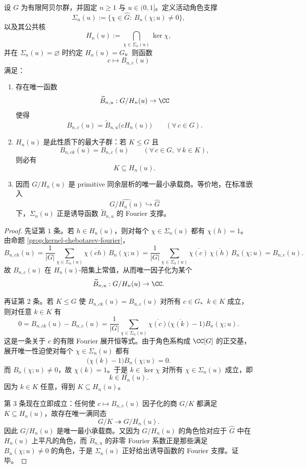 \begin{theorem}\label{thm:conclusion-primitive-minimal-carrier-quotient}
设 \(G\) 为有限阿贝尔群，并固定 \(n\ge 1\) 与 \(u\in(0,1]\)。定义活动角色支撑
\[
\Sigma_n(u):=\{\chi\in\widehat G:\ B_n(\chi;u)\neq 0\},
\]
以及其公共核
\[
H_n(u):=
\bigcap_{\chi\in\Sigma_n(u)}\ker\chi,
\]
并在 \(\Sigma_n(u)=\varnothing\) 时约定 \(H_n(u)=G\)。则函数
\[
c\longmapsto B_{n,c}(u)
\]
满足：
\begin{enumerate}
  \item 存在唯一函数
  \[
  \widetilde B_{n,u}:G/H_n(u)\to\CC
  \]
  使得
  \[
  \boxed{\;
  B_{n,c}(u)=\widetilde B_{n,u}\bigl(cH_n(u)\bigr)
  \qquad(\forall\,c\in G).\;}
  \]
  \item \(H_n(u)\) 是此性质下的最大子群：若 \(K\le G\) 且
  \[
  B_{n,ck}(u)=B_{n,c}(u)
  \qquad(\forall\,c\in G,\ \forall\,k\in K),
  \]
  则必有
  \[
  \boxed{\;
  K\subseteq H_n(u).\;}
  \]
  \item 因而 \(G/H_n(u)\) 是 primitive 同余层析的唯一最小承载商。等价地，在标准嵌入
  \[
  \widehat{G/H_n(u)}\hookrightarrow \widehat G
  \]
  下，\(\Sigma_n(u)\) 正是诱导函数 \(\widetilde B_{n,u}\) 的 Fourier 支撑。
\end{enumerate}
\end{theorem}
\begin{proof}
先证第 \(1\) 条。若 \(h\in H_n(u)\)，则对每个 \(\chi\in\Sigma_n(u)\) 都有 \(\chi(h)=1\)。由命题 \ref{prop:kernel-chebotarev-fourier}，
\[
B_{n,ch}(u)
=
\frac{1}{|G|}\sum_{\chi\in\Sigma_n(u)}
\overline{\chi(ch)}\,B_n(\chi;u)
=
\frac{1}{|G|}\sum_{\chi\in\Sigma_n(u)}
\overline{\chi(c)}\,\overline{\chi(h)}\,B_n(\chi;u)
=
B_{n,c}(u).
\]
故 \(B_{n,c}(u)\) 在 \(H_n(u)\)-陪集上常值，从而唯一因子化为某个
\[
\widetilde B_{n,u}:G/H_n(u)\to\CC.
\]

再证第 \(2\) 条。若 \(K\le G\) 使 \(B_{n,ck}(u)=B_{n,c}(u)\) 对所有 \(c\in G\)、\(k\in K\) 成立，则对任意 \(k\in K\) 有
\[
0
=
B_{n,ck}(u)-B_{n,c}(u)
=
\frac{1}{|G|}\sum_{\chi\in\Sigma_n(u)}
\overline{\chi(c)}\bigl(\overline{\chi(k)}-1\bigr)B_n(\chi;u).
\]
这是一条关于 \(c\) 的有限 Fourier 展开恒等式。由于角色系构成 \(\CC[G]\) 的正交基，展开唯一性迫使对每个 \(\chi\in\Sigma_n(u)\) 都有
\[
\bigl(\overline{\chi(k)}-1\bigr)B_n(\chi;u)=0.
\]
而 \(B_n(\chi;u)\neq 0\)，故 \(\chi(k)=1\)。于是 \(k\in\ker\chi\) 对所有 \(\chi\in\Sigma_n(u)\) 成立，即
\[
k\in H_n(u).
\]
因为 \(k\in K\) 任意，得到 \(K\subseteq H_n(u)\)。

第 \(3\) 条现在立即成立：任何使 \(c\mapsto B_{n,c}(u)\) 因子化的商 \(G/K\) 都满足 \(K\subseteq H_n(u)\)，故存在唯一满同态
\[
G/K\twoheadrightarrow G/H_n(u).
\]
因此 \(G/H_n(u)\) 是唯一最小承载商。又因为 \(G/H_n(u)\) 的角色恰对应于 \(\widehat G\) 中在 \(H_n(u)\) 上平凡的角色，而 \(\widetilde B_{n,u}\) 的非零 Fourier 系数正是那些满足 \(B_n(\chi;u)\neq 0\) 的角色，于是 \(\Sigma_n(u)\) 正好给出诱导函数的 Fourier 支撑。证毕。
\end{proof}
